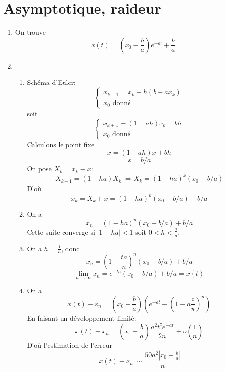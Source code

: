 \documentclass[a4paper]{article}
\begin{document}
\section{Asymptotique, raideur}
\begin{enumerate}
\item On trouve \[x(t)=\left(x_0-\frac ba\right)e^{-a t}+\frac ba\]
\item \begin{enumerate}
\item Schéma d'Euler:
\[\left\{\begin{array}{l}
x_{k+1}=x_k+h(b-a x_k)\\
x_0 \mbox{ donné}
\end{array}\right.
\]
soit
\[\left\{\begin{array}{l}
x_{k+1}=(1-ah)x_k+bh\\
x_0 \mbox{ donné}
\end{array}\right.
\]
Calculons le point fixe
\[x=(1-ah)x+bh\]
\[x=b/a\]
On pose $X_k=x_k-x$:
\[X_{k+1}=(1-ha)X_k\ \Longrightarrow X_k=(1-h a)^k(x_0-b/a)\]
D'où \[x_k=X_k+x=(1-h a)^k(x_0-b/a)+b/a\]
\item On a 
\[x_n=(1-ha)^n(x_0-b/a)+b/a\]
Cette suite converge si $|1-ha|<1$ soit $0<h<\frac 2a$.
\item On a $h=\frac 1n$, donc
  \[x_n=(1-\frac {ta}n)^n(x_0-b/a)+b/a\]
\[\lim_{n\to\infty}x_n=e^{-ta}(x_0-b/a)+b/a=x(t)\]

\item On a \[x(t)-x_n=(x_0-\frac ba)\left(e^{-at}-(1-a\frac tn)^n\right)\]
En faisant un développement limité:
\[x(t)-x_n=(x_0-\frac ba)\frac{a^2t^2e^{-at}}{2n}+o(\frac 1n)\]
D'où l'estimation de l'erreur
\[|x(t)-x_n|\sim\frac{50a^2|x_0-\frac ba|}{n}\]
\end{enumerate}
\end{enumerate}
\end{document}
